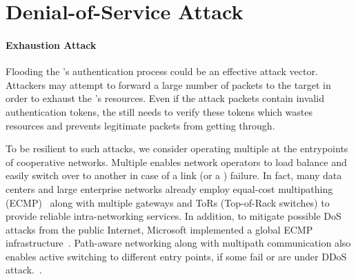 
\section{Denial-of-Service Attack}
\label{sec:disrupting}

\paragraph{Exhaustion Attack}
Flooding the \tp's authentication process could be an effective attack vector. Attackers
may attempt to forward a large number of packets to the target \tp in order to exhaust the
\tp's resources. Even if the attack packets contain invalid authentication tokens, the \tp still
needs to verify these tokens which wastes resources and prevents legitimate packets from getting through.

To be resilient to such attacks, we consider operating multiple \tps at the entrypoints
of cooperative networks. Multiple \tps enables network operators
to load balance and easily switch over to another \tp in case of a link (or a \tp)
failure. In fact, many data centers and large enterprise networks already employ equal-cost
multipathing (ECMP)~\cite{rfc2991,rfc2992} along with multiple gateways and ToRs (Top-of-Rack
switches) to provide reliable intra-networking services. In addition, to mitigate possible DoS
attacks from the public Internet, Microsoft implemented a global ECMP
infrastructure~\cite{ms2020ecmp}. Path-aware networking along with multipath communication
also enables active switching to different entry points, if some fail or are under DDoS attack.~\cite{Dawkins2018,Trammell2018}.


